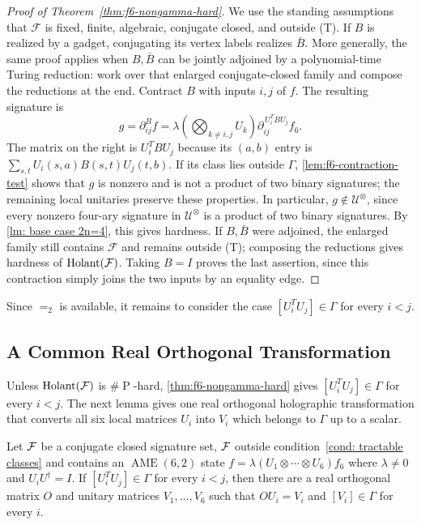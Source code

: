 \begin{proof}[Proof of Theorem~\ref{thm:f6-nongamma-hard}]
We use the standing assumptions that $\mathcal F$ is fixed, finite,
algebraic, conjugate closed, and outside \textup{(T)}.
If $B$ is realized by a gadget, conjugating its vertex labels
realizes $\bar B$. More generally, the same proof applies when
$B,\bar B$ can be jointly adjoined by a polynomial-time Turing
reduction: work over that enlarged conjugate-closed family and
compose the reductions at the end.
Contract $B$ with inputs $i,j$ of $f$. The resulting signature is
\[
 g=\partial_{ij}^Bf
 =\lambda\left(\bigotimes_{k\ne i,j}U_k\right)
       \partial_{ij}^{\,U_i^TBU_j}f_6.
\]
The matrix on the right is $U_i^TBU_j$ because its $(a,b)$ entry is
$\sum_{s,t}U_i(s,a)B(s,t)U_j(t,b)$.
If its class lies outside $\Gamma$, \cref{lem:f6-contraction-test}
shows that $g$ is nonzero and is not a product of two binary signatures;
the remaining local unitaries preserve these properties.
In particular, $g\notin\mathcal U^\otimes$, since every nonzero
four-ary signature in $\mathcal U^\otimes$ is a product of two
binary signatures. By \cref{lm: base case 2n=4}, this gives hardness.
If $B,\bar B$ were adjoined, the enlarged family still contains
$\mathcal F$ and remains outside \textup{(T)}; composing the
reductions gives hardness of $\operatorname{Holant}(\mathcal F)$.
Taking $B=I$ proves the last assertion, since this contraction
simply joins the two inputs by an equality edge.
\end{proof}

Since $=_2$ is available, it remains to consider the case
$[U_i^TU_j]\in\Gamma$ for every $i<j$.


\subsection{A Common Real Orthogonal Transformation}
\label{subsec:f6-real-orthogonal}

Unless $\operatorname{Holant}(\mathcal{F})$ is $\#\operatorname{P}$-hard, \cref{thm:f6-nongamma-hard} gives
$[U_i^TU_j]\in\Gamma$ for every $i<j$. The next lemma gives one real
orthogonal holographic transformation that converts all six local matrices $U_i$ into
$V_i$ which belongs to $\Gamma$ up to a scalar.

\begin{lemma}
\label{lem:f6-common-orthogonal}
Let $\mathcal{F}$ be a conjugate closed signature set, $\mathcal{F}$ outside condition~\eqref{cond: tractable classes} and contains an $\operatorname{AME}(6,2)$ state $f=\lambda(U_1\otimes\cdots \otimes U_6)f_6$ where $\lambda\neq 0$ and $U_iU^\dagger=I$.
If
$[U_i^TU_j]\in\Gamma$ for every $i<j$,
then there are a real orthogonal matrix $O$ and unitary matrices
$V_1,\ldots,V_6$ such that $OU_i=V_i$ and $[V_i]\in\Gamma$ for
every $i$. 
\end{lemma}

